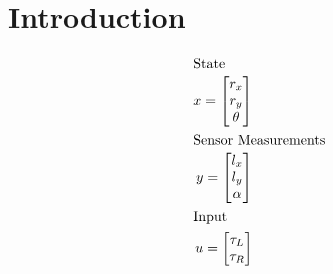 \documentclass[12pt, letterpaper]{amsart} %
\numberwithin{equation}{section}
\begin{document}
\section{Introduction}
\begin{align*}
  \intertext{State}
  x = 
  \begin{bmatrix}
    r_x \\
    r_y \\
    \theta 
  \end{bmatrix} \\
  \intertext{Sensor Measurements}
  y = 
  \begin{bmatrix}
    l_x \\
    l_y \\
    \alpha
  \end{bmatrix} \\
  \intertext{Input}
  u = 
  \begin{bmatrix}
    \tau_L \\
    \tau_R
  \end{bmatrix} \\  
\end{align*}
\end{document}
